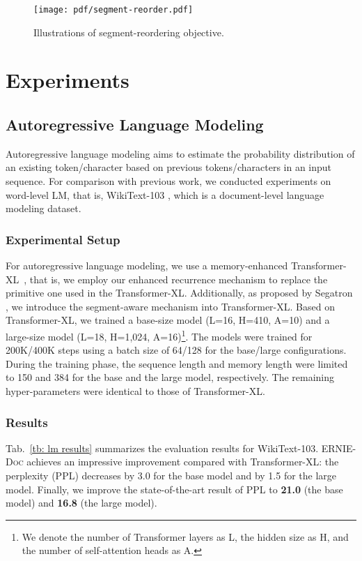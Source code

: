 \documentclass[11pt,a4paper]{article}
\newcommand{\mname}{\textsc{ERNIE-Doc}\xspace}
\begin{document}
\begin{figure}[t]
\centering
\texttt{[image: pdf/segment-reorder.pdf]}
\caption{Illustrations of segment-reordering objective.}
\label{fig:segment-reorder}
\vspace{-0.5cm}
\end{figure}

\section{Experiments}
\subsection{Autoregressive Language Modeling}
Autoregressive language modeling aims to estimate the probability distribution of an existing token/character based on previous tokens/characters in an input sequence. For comparison with previous work, we conducted experiments on word-level LM, that is, WikiText-103 \citep{wikitext}, which is a document-level language modeling dataset.

\subsubsection{Experimental Setup}
For autoregressive language modeling, we use a memory-enhanced Transformer-XL~\citep{transformer_xl}, that is, we employ our enhanced recurrence mechanism to replace the primitive one used in the Transformer-XL. Additionally, as proposed by Segatron \citep{bai2020segabert}, we introduce the segment-aware mechanism into Transformer-XL. Based on Transformer-XL, we trained a base-size model (L=16, H=410, A=10) and a large-size model (L=18, H=1,024, A=16)\footnote{We denote the number of Transformer layers as L, the hidden size as H, and the number of self-attention heads as A.}. The models were trained for 200K/400K steps using a batch size of 64/128 for the base/large configurations. During the training phase, the sequence length and memory length were limited to 150 and 384 for the base and the large model, respectively. The remaining hyper-parameters were identical to those of Transformer-XL.

\subsubsection{Results}
Tab.~\ref{tb: lm results} summarizes the evaluation results for WikiText-103. \mname achieves an impressive improvement compared with Transformer-XL: the perplexity (PPL) decreases by 3.0 for the base model and by 1.5 for the large model. Finally, we improve the state-of-the-art result of PPL to \textbf{21.0} (the base model) and \textbf{16.8} (the large model).
\end{document}
